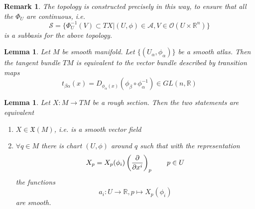 \documentclass{article}
\numberwithin{theorem}{section}
\newtheorem{lemma}[theorem]{Lemma}
\newtheorem*{remark}{Remark}
\newcommand{\R}{\mathbb{R}}
\newcommand{\1}{\mathds{1}}
\begin{document}
\begin{remark}
    The topology is constructed precisely in this way, to ensure that all the $\Phi_U$ are continuous, i.e. 
    \[ \mathcal{S} = \{ \Phi_U^{-1}(V) \subset TX | (U, \phi) \in \mathscr{A}, V \in \mathcal{O}(U \times \R^n) \} \]
    is a subbasis for the above topology. 
\end{remark}

\iffalse 
\begin{proof}
    Let $\mathcal{T}$ be the above topology and $\mathcal{T}_{\mathcal{S}}$ be the topology induced by the subbasis. Clearly 
    \[ \Phi_W(\Phi^{-1}_U(V\times \tilde{V}) \cap \pi^{-1}(W)) = (W\cap V )\times \tilde{V}  \in \mathcal{O}(\R^{2n})\]
    and hence $\mathcal{T}_{\mathcal{S}} \subset \mathcal{T}$ as the $\Phi_U$ are now continuous. On the other hand, let $W\in \mathcal{T}$ open. Then as $\Phi_U$ is continuous with respect to $\mathcal{T}_{\mathcal{S}}$ and $\Phi_U(W \cap \pi^{-1}(U))$ is open, so is
    \[ \Phi_U^{-1}(\Phi_U(W\cap \pi^{-1}(U)))= W \cap \pi^{-1}(U) \]
    Hence as topologies are union closed and the charts cover $TX$
    \[ W = \bigcup_{(U,\phi) \in [\mathscr{A}]} W \cap \pi^{-1}(U) \in \mathcal{T}_{\mathcal{S}} \]
    Therefore $\mathcal{T} = \mathcal{T}_{\mathcal{S}}$. 

\end{proof}
\fi 

\begin{lemma}
    Let $M$ be smooth manifold. Let $\{ (U_\alpha, \phi_\alpha) \} $ be a smooth atlas. Then the tangent bundle $TM$ is equivalent to the vector bundle described by transition maps 
    \[ t_{\beta \alpha}(x) = D_{\phi_\alpha(x)}(\phi_\beta \circ \phi_\alpha^{-1}) \in GL(n, \R) \]
\end{lemma}

\begin{lemma}
    Let $X : M \to TM$ be a rough section. Then the two statements are equivalent 
    \begin{enumerate}
        \item $X \in \mathfrak{X}(M)$, i.e. is a smooth vector field 
        \item $\forall q \in M$ there is chart $(U, \phi)$ around $q$ such that with the representation 
        \[  X_p = X_p(\phi_i) \left( \pdv{}{x^i} \right)_p  \qquad p \in U \]
        the functions 
        \[ a_i : U \to \R, p \mapsto X_p(\phi_i) \]
        are smooth. 
    \end{enumerate}
\end{lemma}
\end{document}
